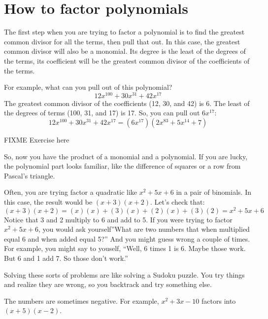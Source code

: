 \section{How to factor polynomials}

The first step when you are trying to factor a polynomial is to find
the greatest common divisor for all the terms, then pull that out. In
this case, the greatest common divisor will also be a monomial. Its
degree is the least of the degrees of the terms, its coefficient will
be the greatest common divisor of the coefficients of the terms.

For example, what can you pull out of this polynomial?
\begin{equation*}
12x^100 + 30x^31 + 42x^17
\end{equation*}
The greatest common divisor of the coefficients (12, 30, and 42) is 6.  The least of the degrees of terms (100, 31, and 17) is 17.  So, you can pull out $6x^17$:
\begin{equation*}
12x^100 + 30x^31 + 42x^17 = (6x^17)(2x^83 + 5x^14 + 7)
\end{equation*}

\begin{Exercise}[title={Factoring out the GCD monomial}, label=gcdmonomial]
FIXME Exercise here
\end{Exercise}
\begin{Answer}[ref=gcdmonomial]
  
\end{Answer}

So, now you have the product of a monomial and a polynomial. If you
are lucky, the polynomial part looks familiar, like the difference of
squares or a row from Pascal's triangle.

Often, you are trying factor a quadratic like $x^2 + 5x + 6$ in a pair
of binomials. In this case, the result would be $(x + 3)(x + 2)$. Let's check that:
\begin{equation*}
  (x + 3)(x + 2) = (x)(x) + (3)(x) + (2)(x) + (3)(2) = x^2 + 5x + 6
\end{equation*}
Notice that 3 and 2 multiply to 6 and add to 5. If you were trying to
factor $x^2 + 5x + 6$, you would ask yourself''What are two numbers that
when multiplied equal 6 and when added equal 5?'' And you might
guess wrong a couple of times. For example, you might say to youself,
``Well, 6 times 1 is 6. Maybe those work. But 6 and 1 add 7. So those
don't work.''

Solving these sorts of problems are like solving a Sudoku puzzle. You
try things and realize they are wrong, so you backtrack and try
something else.

The numbers are sometimes negative. For example, $x^2 + 3x - 10$ factors into $(x + 5)(x - 2)$.

\begin{Exercise}[title={Factoring quadratics}, label=factorquadratics]
  
\end{Exercise}
\begin{Answer}[ref=factorquadratics]
  
\end{Answer}
